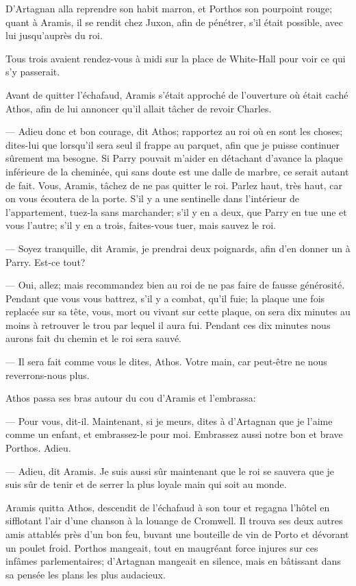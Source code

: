 D'Artagnan alla reprendre son habit marron, et Porthos son pourpoint rouge; quant à Aramis, il se rendit chez Juxon, afin de pénétrer, s'il était possible, avec lui jusqu'auprès du roi.

Tous trois avaient rendez-vous à midi sur la place de White-Hall pour voir ce qui s'y passerait.

Avant de quitter l'échafaud, Aramis s'était approché de l'ouverture où était caché Athos, afin de lui annoncer qu'il allait tâcher de revoir Charles.

— Adieu donc et bon courage, dit Athos; rapportez au roi où en sont les choses; dites-lui que lorsqu'il sera seul il frappe au parquet, afin que je puisse continuer sûrement ma besogne. Si Parry pouvait m'aider en détachant d'avance la plaque inférieure de la cheminée, qui sans doute est une dalle de marbre, ce serait autant de fait. Vous, Aramis, tâchez de ne pas quitter le roi. Parlez haut, très haut, car on vous écoutera de la porte. S'il y a une sentinelle dans l'intérieur de l'appartement, tuez-la sans marchander; s'il y en a deux, que Parry en tue une et vous l'autre; s'il y en a trois, faites-vous tuer, mais sauvez le roi.

— Soyez tranquille, dit Aramis, je prendrai deux poignards, afin d'en donner un à Parry. Est-ce tout?

— Oui, allez; mais recommandez bien au roi de ne pas faire de fausse générosité. Pendant que vous vous battrez, s'il y a combat, qu'il fuie; la plaque une fois replacée sur sa tête, vous, mort ou vivant sur cette plaque, on sera dix minutes au moins à retrouver le trou par lequel il aura fui. Pendant ces dix minutes nous aurons fait du chemin et le roi sera sauvé.

— Il sera fait comme vous le dites, Athos. Votre main, car peut-être ne nous reverrons-nous plus.

Athos passa ses bras autour du cou d'Aramis et l'embrassa:

— Pour vous, dit-il. Maintenant, si je meurs, dites à d'Artagnan que je l'aime comme un enfant, et embrassez-le pour moi. Embrassez aussi notre bon et brave Porthos. Adieu.

— Adieu, dit Aramis. Je suis aussi sûr maintenant que le roi se sauvera que je suis sûr de tenir et de serrer la plus loyale main qui soit au monde.

Aramis quitta Athos, descendit de l'échafaud à son tour et regagna l'hôtel en sifflotant l'air d'une chanson à la louange de Cromwell. Il trouva ses deux autres amis attablés près d'un bon feu, buvant une bouteille de vin de Porto et dévorant un poulet froid. Porthos mangeait, tout en maugréant force injures sur ces infâmes parlementaires; d'Artagnan mangeait en silence, mais en bâtissant dans sa pensée les plans les plus audacieux.

